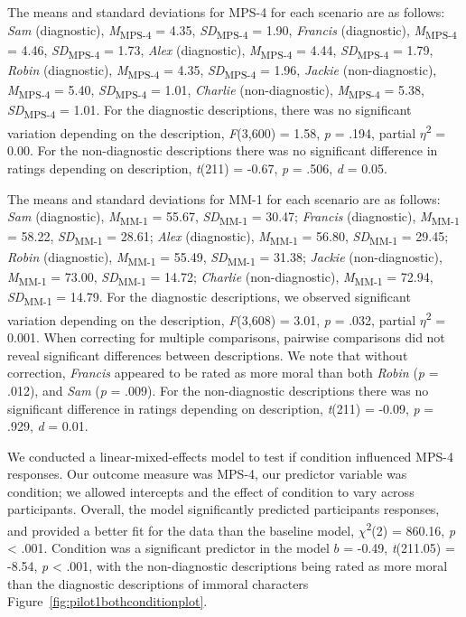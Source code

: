 \documentclass[
  man,floatsintext]{apa6}
\begin{document}
The means and standard deviations for MPS-4 for each scenario are as follows:
\emph{Sam} (diagnostic),
\emph{M}\textsubscript{MPS-4} = 4.35, \emph{SD}\textsubscript{MPS-4} = 1.90,
\emph{Francis} (diagnostic),
\emph{M}\textsubscript{MPS-4} = 4.46, \emph{SD}\textsubscript{MPS-4} = 1.73,
\emph{Alex} (diagnostic),
\emph{M}\textsubscript{MPS-4} = 4.44, \emph{SD}\textsubscript{MPS-4} = 1.79,
\emph{Robin} (diagnostic),
\emph{M}\textsubscript{MPS-4} = 4.35, \emph{SD}\textsubscript{MPS-4} = 1.96,
\emph{Jackie} (non-diagnostic),
\emph{M}\textsubscript{MPS-4} = 5.40, \emph{SD}\textsubscript{MPS-4} = 1.01,
\emph{Charlie} (non-diagnostic),
\emph{M}\textsubscript{MPS-4} = 5.38, \emph{SD}\textsubscript{MPS-4} = 1.01. For the diagnostic descriptions, there was no significant variation depending on the description, \emph{F}(3,600) = 1.58, \emph{p} = .194, partial \(\eta\)\textsuperscript{2} = 0.00. For the non-diagnostic descriptions there was no significant difference in ratings depending on description, \emph{t}(211) = -0.67, \emph{p} = .506, \emph{d} = 0.05.

The means and standard deviations for MM-1 for each scenario are as follows:
\emph{Sam} (diagnostic),
\emph{M}\textsubscript{MM-1} = 55.67, \emph{SD}\textsubscript{MM-1} = 30.47;
\emph{Francis} (diagnostic),
\emph{M}\textsubscript{MM-1} = 58.22, \emph{SD}\textsubscript{MM-1} = 28.61;
\emph{Alex} (diagnostic),
\emph{M}\textsubscript{MM-1} = 56.80, \emph{SD}\textsubscript{MM-1} = 29.45;
\emph{Robin} (diagnostic),
\emph{M}\textsubscript{MM-1} = 55.49, \emph{SD}\textsubscript{MM-1} = 31.38;
\emph{Jackie} (non-diagnostic),
\emph{M}\textsubscript{MM-1} = 73.00, \emph{SD}\textsubscript{MM-1} = 14.72;
\emph{Charlie} (non-diagnostic),
\emph{M}\textsubscript{MM-1} = 72.94, \emph{SD}\textsubscript{MM-1} = 14.79. For the diagnostic descriptions, we observed significant variation depending on the description, \emph{F}(3,608) = 3.01, \emph{p} = .032, partial \(\eta\)\textsuperscript{2} = 0.001. When correcting for multiple comparisons, pairwise comparisons did not reveal significant differences between descriptions. We note that without correction, \emph{Francis} appeared to be rated as more moral than both \emph{Robin} (\emph{p} = .012), and \emph{Sam} (\emph{p} = .009). For the non-diagnostic descriptions there was no significant difference in ratings depending on description, \emph{t}(211) = -0.09, \emph{p} = .929, \emph{d} = 0.01.

We conducted a linear-mixed-effects model to test if condition influenced MPS-4 responses. Our outcome measure was MPS-4, our predictor variable was condition; we allowed intercepts and the effect of condition to vary across participants.
Overall, the model significantly predicted participants responses, and provided a better fit for the data than the baseline model, \(\chi\)\textsuperscript{2}(2) = 860.16, \emph{p} \textless{} .001. Condition was a significant predictor in the model \(b\) = -0.49, \emph{t}(211.05) = -8.54, \emph{p} \textless{} .001, with the non-diagnostic descriptions being rated as more moral than the diagnostic descriptions of immoral characters Figure~\ref{fig:pilot1bothconditionplot}.
\end{document}
